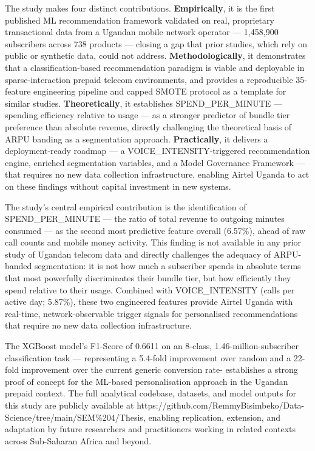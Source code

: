 The study makes four distinct contributions. \textbf{Empirically}, it is the first
published ML recommendation framework validated on real, proprietary transactional
data from a Ugandan mobile network operator --- 1,458,900 subscribers across 738
products --- closing a gap that prior studies, which rely on public or synthetic
data, could not address. \textbf{Methodologically}, it demonstrates that a
classification-based recommendation paradigm is viable and deployable in
sparse-interaction prepaid telecom environments, and provides a reproducible
35-feature engineering pipeline and capped SMOTE protocol as a template for
similar studies. \textbf{Theoretically}, it establishes SPEND\_PER\_MINUTE ---
spending efficiency relative to usage --- as a stronger predictor of bundle tier
preference than absolute revenue, directly challenging the theoretical basis of
ARPU banding as a segmentation approach. \textbf{Practically}, it delivers a
deployment-ready roadmap --- a VOICE\_INTENSITY-triggered recommendation engine,
enriched segmentation variables, and a Model Governance Framework --- that requires
no new data collection infrastructure, enabling Airtel Uganda to act on these
findings without capital investment in new systems.

The study's central empirical contribution is the identification of SPEND\_PER\_MINUTE --- the ratio of total revenue to outgoing minutes consumed --- as the second most predictive feature overall (6.57\%), ahead of raw call counts and mobile money activity. This finding is not available in any prior study of Ugandan telecom data and directly challenges the adequacy of ARPU-banded segmentation: it is not how much a subscriber spends in absolute terms that most powerfully discriminates their bundle tier, but how efficiently they spend relative to their usage. Combined with VOICE\_INTENSITY (calls per active day; 5.87\%), these two engineered features provide Airtel Uganda with real-time, network-observable trigger signals for personalised recommendations that require no new data collection infrastructure.

The XGBoost model's F1-Score of 0.6611 on an 8-class, 1.46-million-subscriber classification task --- representing a 5.4-fold improvement over random and a 22-fold improvement over the current generic conversion rate- establishes a strong proof of concept for the ML-based personalisation approach in the Ugandan prepaid context. The full analytical codebase, datasets, and model outputs for this study are publicly available at https://github.com/RemmyBisimbeko/Data-Science/tree/main/SEM\%204/Thesis, enabling replication, extension, and adaptation by future researchers and practitioners working in related contexts across Sub-Saharan Africa and beyond.
